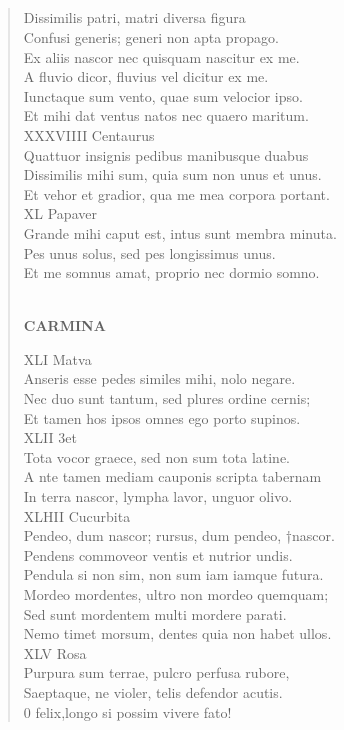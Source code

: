 \documentclass[11pt, a4paper]{report}
\begin{document}
            \subsection*{}
      \begin{verse}
      Dissimilis patri, matri diversa figura \\ Confusi generis; generi non apta propago. \\ Ex aliis nascor nec quisquam nascitur ex me. \\ A fluvio dicor, fluvius vel dicitur ex me. \\ Iunctaque sum vento, quae sum velocior ipso. \\ Et mihi dat ventus natos nec quaero maritum. \\ XXXVIIII Centaurus \\ Quattuor insignis pedibus manibusque duabus \\ Dissimilis mihi sum, quia sum non unus et unus. \\ Et vehor et gradior, qua me mea corpora portant. \\ XL Papaver \\ Grande mihi caput est, intus sunt membra minuta. \\ Pes unus solus, sed pes longissimus unus. \\ Et me somnus amat, proprio nec dormio somno. \\ 
        ﻿\pagebreak 
     \marginpar{[232]} \begin{center} \textbf{CARMINA} \end{center}XLI Matva \\ Anseris esse pedes similes mihi, nolo negare. \\ Nec duo sunt tantum, sed plures ordine cernis; \\ Et tamen hos ipsos omnes ego porto supinos. \\ XLII 3et \\ Tota vocor graece, sed non sum tota latine. \\ A nte tamen mediam cauponis scripta tabernam \\ In terra nascor, lympha lavor, unguor olivo. \\ XLHII Cucurbita \\ Pendeo, dum nascor; rursus, dum pendeo, †nascor. \\ Pendens commoveor ventis et nutrior undis. \\ Pendula si non sim, non sum iam iamque futura. \\ Mordeo mordentes, ultro non mordeo quemquam; \\ Sed sunt mordentem multi mordere parati. \\ Nemo timet morsum, dentes quia non habet ullos. \\ XLV Rosa \\ Purpura sum terrae, pulcro perfusa rubore, \\ Saeptaque, ne violer, telis defendor acutis. \\ 0 felix,longo si possim vivere fato! \\ 

\end{verse}
\end{document}
